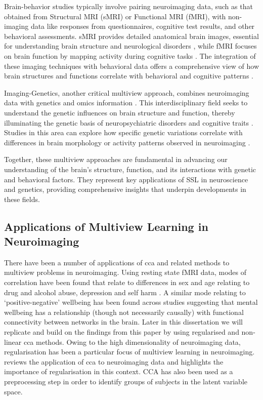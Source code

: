 Brain-behavior studies typically involve pairing neuroimaging data, such as that obtained from Structural MRI (sMRI) or Functional MRI (fMRI), with non-imaging data like responses from questionnaires, cognitive test results, and other behavioral assessments.
sMRI provides detailed anatomical brain images, essential for understanding brain structure and neurological disorders \citep{kanai2011structural}, while fMRI focuses on brain function by mapping activity during cognitive tasks \citep{miranda2021systematic}.
The integration of these imaging techniques with behavioral data offers a comprehensive view of how brain structures and functions correlate with behavioral and cognitive patterns \citep{rypma2001age,genon2022linking}.

Imaging-Genetics, another critical multiview approach, combines neuroimaging data with genetics and omics information \citep{le2008sparse}.
This interdisciplinary field seeks to understand the genetic influences on brain structure and function, thereby illuminating the genetic basis of neuropsychiatric disorders and cognitive traits \citep{bogdan2017imaging}.
Studies in this area can explore how specific genetic variations correlate with differences in brain morphology or activity patterns observed in neuroimaging \citep{liu2014review}.

Together, these multiview approaches are fundamental in advancing our understanding of the brain's structure, function, and its interactions with genetic and behavioral factors.
They represent key applications of SSL in neuroscience and genetics, providing comprehensive insights that underpin developments in these fields.

\subsection{Applications of Multiview Learning in Neuroimaging}

There have been a number of applications of \acrshort{cca} and related methods to multiview problems in neuroimaging.
Using resting state fMRI data, modes of correlation have been found that relate to differences in sex and age relating to drug and alcohol abuse, depression and self harm \citep{mihalik2019brain}.
A similar mode relating to `positive-negative' wellbeing has been found across studies \citep{smith2015positive} suggesting that mental wellbeing has a relationship (though not necessarily causally) with functional connectivity between networks in the brain.
Later in this dissertation we will replicate and build on the findings from this paper by using regularised and non-linear \acrshort{cca} methods.
Owing to the high dimensionality of neuroimaging data, regularisation has been a particular focus of multiview learning in neuroimaging. \citet{mihalik2022canonical} reviews the application of \acrshort{cca} to neuroimaging data and highlights the importance of regularisation in this context. \citet{bilenko2016pyrcca} 
CCA has also been used as a preprocessing step in order to identify groups of subjects in the latent variable space.

